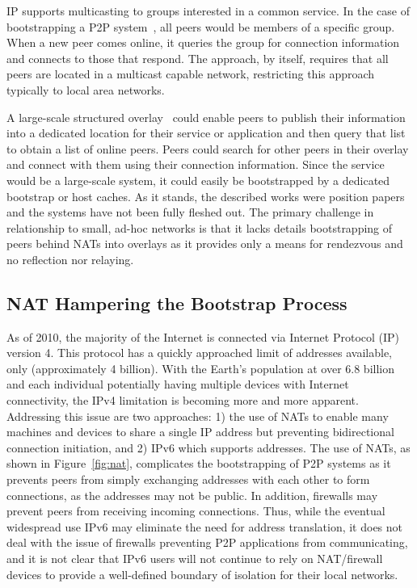 \documentclass[conference]{IEEEtran}
\begin{document}
IP supports multicasting to groups interested in a common service.  In the case
of bootstrapping a P2P system~\cite{pastry, locality_aware}, all peers would be
members of a specific group.  When a new peer comes online, it queries the
group for connection information and connects to those that respond.  The
approach, by itself, requires that all peers are located in a multicast capable
network, restricting this approach typically to local area networks.

A large-scale structured overlay~\cite{one_ring, p2p_bootstrap} could enable
peers to publish their information into a dedicated location for their service
or application and then query that list to obtain a list of online peers.
Peers could search for other peers in their overlay and connect with them using
their connection information.  Since the service would be a large-scale system,
it could easily be bootstrapped by a dedicated bootstrap or host caches.  As it
stands, the described works were position papers and the systems have not been
fully fleshed out.  The primary challenge in relationship to small, ad-hoc
networks is that it lacks details bootstrapping of peers behind NATs into
overlays as it provides only a means for rendezvous and no reflection nor
relaying.

\subsection{NAT Hampering the Bootstrap Process}

As of 2010, the majority of the Internet is connected via Internet Protocol
(IP) version 4.  This protocol has a quickly approached limit of addresses
available,  only  (approximately 4 billion).  With the Earth's
population at over 6.8 billion and each individual potentially having multiple
devices with Internet connectivity, the IPv4 limitation is becoming more and
more apparent.  Addressing this issue are two approaches:  1) the use of NATs
to enable many machines and devices to share a single IP address but preventing
bidirectional connection initiation, and 2) IPv6 which supports 
addresses.  The use of NATs, as shown in Figure~\ref{fig:nat}, complicates the
bootstrapping of P2P systems as it prevents peers from simply exchanging
addresses with each other to form connections, as the addresses may not be
public.  In addition, firewalls may prevent peers from receiving incoming
connections.  Thus, while the eventual widespread use IPv6 may eliminate the
need for address translation, it does not deal with the issue of firewalls
preventing P2P applications from communicating, and it is not clear that IPv6
users will not continue to rely on NAT/firewall devices to provide a
well-defined boundary of isolation for their local networks.
\end{document}
